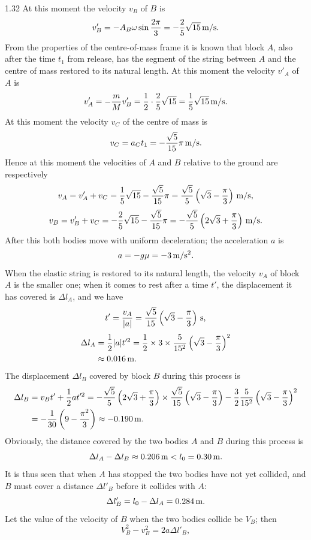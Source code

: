 \begin{solution}{1.32}
At this moment the velocity $v_B$ of $B$ is
\[
v'_B=-A_B\omega\sin\frac{2\pi}{3}=-\frac{2}{5}\sqrt{15}\,\mathrm{m/s}.
\]
From the properties of the centre-of-mass frame it is known that block $A$, also after the time $t_1$ from release, has the segment of the string between $A$ and the centre of mass restored to its natural length. At this moment the velocity $v'_A$ of $A$ is
\[
v'_A=-\frac{m}{M}v'_B=\frac{1}{2}\cdot\frac{2}{5}\sqrt{15}=\frac{1}{5}\sqrt{15}\,\mathrm{m/s}.
\]
At this moment the velocity $v_C$ of the centre of mass is
\[
v_C=a_Ct_1=-\frac{\sqrt{5}}{15}\pi\,\mathrm{m/s}.
\]
Hence at this moment the velocities of $A$ and $B$ relative to the ground are respectively
\[
v_A=v'_A+v_C=\frac{1}{5}\sqrt{15}-\frac{\sqrt{5}}{15}\pi=\frac{\sqrt{5}}{5}\left(\sqrt{3}-\frac{\pi}{3}\right)\,\mathrm{m/s},
\]
\[
v_B=v'_B+v_C=-\frac{2}{5}\sqrt{15}-\frac{\sqrt{5}}{15}\pi=-\frac{\sqrt{5}}{5}\left(2\sqrt{3}+\frac{\pi}{3}\right)\,\mathrm{m/s}.
\]
After this both bodies move with uniform deceleration; the acceleration $a$ is
\[
a=-g\mu=-3\,\mathrm{m/s^2}.
\]
When the elastic string is restored to its natural length, the velocity $v_A$ of block $A$ is the smaller one; when it comes to rest after a time $t'$, the displacement it has covered is $\Delta l_A$, and we have
\[
t'=\frac{v_A}{|a|}=\frac{\sqrt{5}}{15}\left(\sqrt{3}-\frac{\pi}{3}\right)\,\mathrm{s},
\]
\begin{align*}
\Delta l_A&=\frac{1}{2}|a|t'^2=\frac{1}{2}\times 3\times\frac{5}{15^2}\left(\sqrt{3}-\frac{\pi}{3}\right)^2\\
&\approx 0.016\,\mathrm{m}.
\end{align*}
The displacement $\Delta l_B$ covered by block $B$ during this process is
\begin{align*}
\Delta l_B&=v_Bt'+\frac{1}{2}at'^2=-\frac{\sqrt{5}}{5}\left(2\sqrt{3}+\frac{\pi}{3}\right)\times\frac{\sqrt{5}}{15}\left(\sqrt{3}-\frac{\pi}{3}\right)-\frac{3}{2}\frac{5}{15^2}\left(\sqrt{3}-\frac{\pi}{3}\right)^2\\
&=-\frac{1}{30}\left(9-\frac{\pi^2}{3}\right)\approx -0.190\,\mathrm{m}.
\end{align*}
Obviously, the distance covered by the two bodies $A$ and $B$ during this process is
\[
\Delta l_A-\Delta l_B\approx 0.206\,\mathrm{m}<l_0=0.30\,\mathrm{m}.
\]
It is thus seen that when $A$ has stopped the two bodies have not yet collided, and $B$ must cover a distance $\Delta l'_B$ before it collides with $A$:
\[
\Delta l'_B=l_0-\Delta l_A=0.284\,\mathrm{m}.
\]
Let the value of the velocity of $B$ when the two bodies collide be $V_B$; then
\[
V_B^2-v_B^2=2a\Delta l'_B,
\]
\end{solution}
